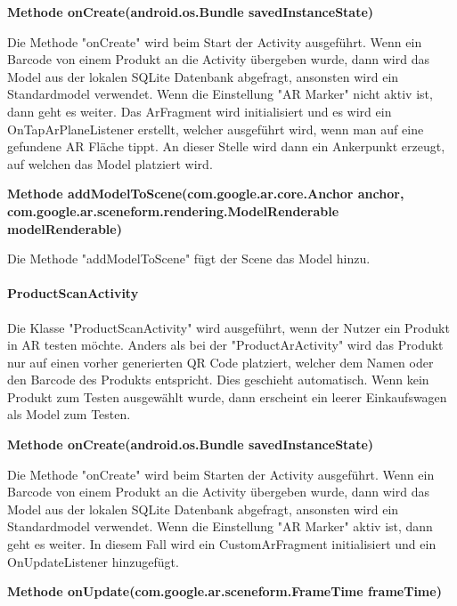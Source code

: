 \documentclass{scrartcl}
\begin{document}
\noindent\textbf{Methode onCreate(android.os.Bundle savedInstanceState)} 

\noindent Die Methode "onCreate" wird beim Start der Activity ausgeführt. Wenn ein Barcode von einem Produkt an die Activity übergeben wurde, dann wird das Model aus der lokalen SQLite Datenbank abgefragt, ansonsten wird ein Standardmodel verwendet. Wenn die Einstellung "AR Marker" nicht aktiv ist, dann geht es weiter. Das ArFragment wird initialisiert und es wird ein OnTapArPlaneListener erstellt, welcher ausgeführt wird, wenn man auf eine gefundene AR Fläche tippt. An dieser Stelle wird dann ein Ankerpunkt erzeugt, auf welchen das Model platziert wird.\newline

\noindent\textbf{Methode addModelToScene(com.google.ar.core.Anchor anchor, \newline com.google.ar.sceneform.rendering.ModelRenderable modelRenderable)} 

\noindent Die Methode "addModelToScene" fügt der Scene das Model hinzu. \newline 



\paragraph{ProductScanActivity} Die Klasse "ProductScanActivity" wird ausgeführt, wenn der Nutzer ein Produkt in AR testen möchte. Anders als bei der "ProductArActivity" wird das Produkt nur auf einen vorher generierten QR Code platziert, welcher dem Namen oder den Barcode des Produkts entspricht. Dies geschieht automatisch. Wenn kein Produkt zum Testen ausgewählt wurde, dann erscheint ein leerer Einkaufswagen als Model zum Testen. \newline

\noindent\textbf{Methode onCreate(android.os.Bundle savedInstanceState)}

\noindent Die Methode "onCreate" wird beim Starten der Activity ausgeführt. Wenn ein Barcode von einem Produkt an die Activity übergeben wurde, dann wird das Model aus der lokalen SQLite Datenbank abgefragt, ansonsten wird ein Standardmodel verwendet. Wenn die Einstellung "AR Marker" aktiv ist, dann geht es weiter. In diesem Fall wird ein CustomArFragment initialisiert und ein OnUpdateListener hinzugefügt. \newline

\noindent\textbf{Methode onUpdate(com.google.ar.sceneform.FrameTime frameTime)}
\end{document}
